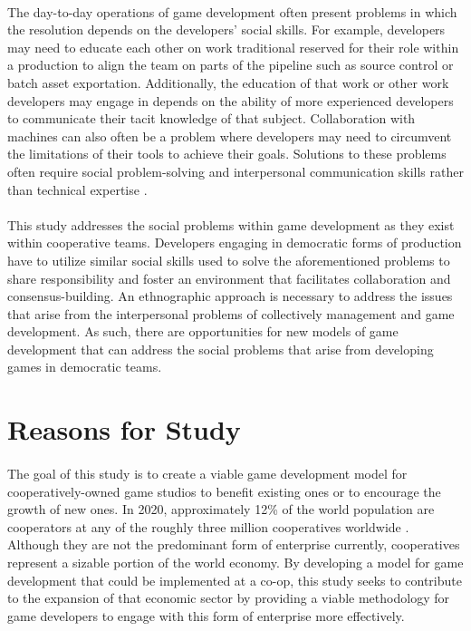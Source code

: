 
\paragraph{} The day-to-day operations of game development often present problems in which the resolution depends on the developers' social skills. For example, developers may need to educate each other on work traditional reserved for their role within a production to align the team on parts of the pipeline such as source control or batch asset exportation. Additionally, the education of that work or other work developers may engage in depends on the ability of more experienced developers to communicate their tacit knowledge of that subject. Collaboration with machines can also often be a problem where developers may need to circumvent the limitations of their tools to achieve their goals. Solutions to these problems often require social problem-solving and interpersonal communication skills rather than technical expertise \autocite{whitson_what_2020}.

\paragraph{} This study addresses the social problems within game development as they exist within cooperative teams. Developers engaging in democratic forms of production have to utilize similar social skills used to solve the aforementioned problems to share responsibility and foster an environment that facilitates collaboration and consensus-building. An ethnographic approach is necessary to address the issues that arise from the interpersonal problems of collectively management and game development. As such, there are opportunities for new models of game development that can address the social problems that arise from developing games in democratic teams.

\section{Reasons for Study}

\paragraph{} The goal of this study is to create a viable game development model for cooperatively-owned game studios to benefit existing ones or to encourage the growth of new ones. In 2020, approximately 12\% of the world population are cooperators at any of the roughly three million cooperatives worldwide \autocite{world_cooperative_monitor_exploring_2020}. Although they are not the predominant form of enterprise currently, cooperatives represent a sizable portion of the world economy. By developing a model for game development that could be implemented at a co-op, this study seeks to contribute to the expansion of that economic sector by providing a viable methodology for game developers to engage with this form of enterprise more effectively.


